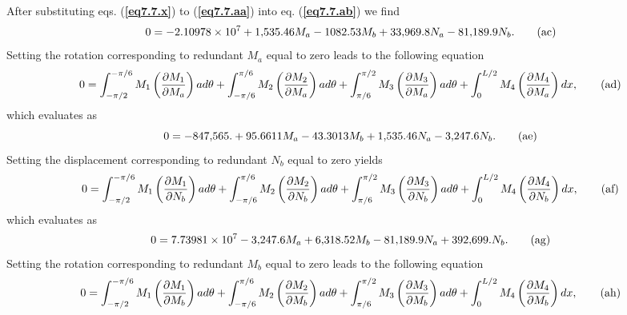\documentclass{AeroStructure-ERJohnson}
\begin{document}
\begin{example}
\noindent After substituting eqs. (\textbf{\ref{eq7.7.x}}) to (\textbf{\ref{eq7.7.aa}}) into eq. (\textbf{\ref{eq7.7.ab}}) we find
\begin{equation}
0=-2.10978 \times 10^{7}+1{,}535.46 M_{a}-1082.53 M_{b}+33{,}969.8 N_{a}-81{,}189.9 N_{b}. \label{eq7.7.ac}\tag{{ac}}
\end{equation}
Setting the rotation corresponding to redundant $M_{a}$ equal to zero leads to the following equation
\begin{equation}
0=\int_{-\pi / 2}^{-\pi / 6} M_{1}\left(\frac{\partial M_{1}}{\partial M_{a}}\right) a d \theta+\int_{-\pi / 6}^{\pi / 6} M_{2}\left(\frac{\partial M_{2}}{\partial M_{a}}\right) a d \theta+\int_{\pi / 6}^{\pi / 2} M_{3}\left(\frac{\partial M_{3}}{\partial M_{a}}\right) a d \theta+\int_{0}^{L / 2} M_{4}\left(\frac{\partial M_{4}}{\partial M_{a}}\right) d x, \label{eq7.7.ad}\tag{{ad}}
\end{equation}
which evaluates as
\begin{equation}
0=-847{,}565 .+95.6611 M_{a}-43.3013 M_{b}+1{,}535.46 N_{a}-3{,}247.6 N_{b}. \label{eq7.7.ae}\tag{{ae}}
\end{equation}
Setting the displacement corresponding to redundant $N_{b}$ equal to zero yields
\begin{equation}
0=\int_{-\pi / 2}^{-\pi / 6} M_{1}\left(\frac{\partial M_{1}}{\partial N_{b}}\right) a d \theta+\int_{-\pi / 6}^{\pi / 6} M_{2}\left(\frac{\partial M_{2}}{\partial N_{b}}\right) a d \theta+\int_{\pi / 6}^{\pi / 2} M_{3}\left(\frac{\partial M_{3}}{\partial N_{b}}\right) a d \theta+\int_{0}^{L / 2} M_{4}\left(\frac{\partial M_{4}}{\partial N_{b}}\right) d x, \label{eq7.7.af}\tag{{af}}
\end{equation}
which evaluates as
\begin{equation}
0=7.73981 \times 10^{7}-3{,}247.6 M_{a}+6{,}318.52 M_{b}-81{,}189.9 N_{a}+392{,}699 . N_{b}. \label{eq7.7.ag}\tag{{ag}}
\end{equation}
Setting the rotation corresponding to redundant $M_{{b}}$ equal to zero leads to the following equation
\begin{equation}
0=\int_{-\pi / 2}^{-\pi / 6} M_{1}\left(\frac{\partial M_{1}}{\partial M_{b}}\right) a d \theta+\int_{-\pi / 6}^{\pi / 6} M_{2}\left(\frac{\partial M_{2}}{\partial M_{b}}\right) a d \theta+\int_{\pi / 6}^{\pi / 2} M_{3}\left(\frac{\partial M_{3}}{\partial M_{b}}\right) a d \theta+\int_{0}^{L / 2} M_{4}\left(\frac{\partial M_{4}}{\partial M_{b}}\right) d x, \label{eq7.7.ah}\tag{{ah}}
\end{equation}

\end{example}
\end{document}
